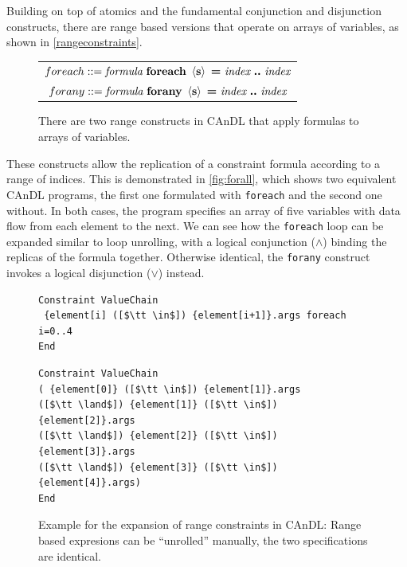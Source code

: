     Building on top of atomics and the fundamental conjunction and disjunction
    constructs, there are range based versions that operate on arrays of
    variables, as shown in \autoref{rangeconstraints}.
\begin{figure}[h]
  \centering
  \begin{tabular}{|c|}
    \hline
    $foreach ::= \text{\it formula}\ \text{\bf foreach}\ \left<\text{\bf s}\right>\ \text{\bf =}\ \text{\it index}\ \text{\bf ..}\ \text{\it index}$\\
    $forany ::= \text{\it formula}\ \text{\bf forany}\ \left<\text{\bf s}\right>\ \text{\bf =}\ \text{\it index}\ \text{\bf ..}\ \text{\it index}$\\
    \hline
  \end{tabular}
  \caption{There are two range constructs in CAnDL that apply formulas to
           arrays of variables.}
  \label{rangeconstraints}
\end{figure}

    \noindent
    These constructs allow the replication of a constraint formula according to
    a range of indices.
    This is demonstrated in \autoref{fig:forall}, which shows two equivalent
    CAnDL programs, the first one formulated with \texttt{foreach} and the
    second one without.
    In both cases, the program specifies an array of five variables with data
    flow from each element to the next.
    We can see how the \texttt{foreach} loop can be expanded similar to loop
    unrolling, with a logical conjunction ($\land$) binding the replicas of the formula
    together.
    Otherwise identical, the \texttt{forany} construct invokes a logical
    disjunction ($\lor$) instead.

\begin{figure}[ht]
\begin{lstlisting}[language=CAnDL]
Constraint ValueChain
 {element[i] ([$\tt \in$]) {element[i+1]}.args foreach i=0..4
End
\end{lstlisting}
\begin{lstlisting}[language=CAnDL]
Constraint ValueChain
( {element[0]} ([$\tt \in$]) {element[1]}.args
([$\tt \land$]) {element[1]} ([$\tt \in$]) {element[2]}.args
([$\tt \land$]) {element[2]} ([$\tt \in$]) {element[3]}.args
([$\tt \land$]) {element[3]} ([$\tt \in$]) {element[4]}.args)
End
\end{lstlisting}
\vspace{-0.3cm}
\caption{Example for the expansion of range constraints in CAnDL:
         Range based expresions can be ``unrolled'' manually, the two
         specifications are identical.}
\label{fig:forall}
\end{figure}

